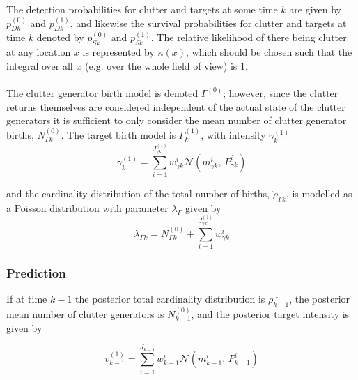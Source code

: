 \documentclass{article}
\begin{document}
The detection probabilities for clutter and targets at some time $k$ are given by $p_{Dk}^{(0)}$ and $p_{Dk}^{(1)}$, and likewise the survival probabilities for clutter and targets at time $k$ denoted by $p_{Sk}^{(0)}$ and $p_{Sk}^{(1)}$. The relative likelihood of there being clutter at any location $x$ is represented by $\kappa(x)$, which should be chosen such that the integral over all $x$ (e.g. over the whole field of view) is $1$.\\
\\
The clutter generator birth model is denoted $\Gamma^{(0)}$; however, since the clutter returns themselves are considered independent of the actual state of the clutter generators it is sufficient to only consider the mean number of clutter generator births, $N_{\Gamma k}^{(0)}$. The target birth model is $\Gamma^{(1)}_k$, with intensity $\gamma^{(1)}_k$
\begin{equation}
  \label{eq:tgt_birth}
\gamma^{(1)}_k = \sum_{i=1}^{J_{\gamma k}^{(1)}}w_{\gamma k}^i \mathcal{N}(m_{\gamma k}^i,\,P_{\gamma k}^i)
\end{equation}

and the cardinality distribution of the total number of births, $\ddot{\rho}_{\Gamma k}$, is modelled as a Poisson distribution with parameter $\lambda_\Gamma$ given by
\begin{equation}
  \label{eq:rho_gamma}
\lambda_{\Gamma k} = N_{\Gamma k}^{(0)} + \sum_{i=1}^{J_{\gamma k}^{(1)}}w_{\gamma k}^i 
\end{equation}

\subsubsection*{Prediction}
If at time $k-1$ the posterior total cardinality distribution is $\ddot{\rho_{k-1}}$, the posterior mean number of clutter generators is $N^{(0)}_{k-1}$, and the posterior target intensity is given by

\begin{equation}
  \label{eq:vk}
  v^{(1)}_{k-1} = \sum_{i = 1}^{J_{k-1}}w_{k-1}^i \mathcal{N}(m_{k-1}^i,\,P_{k-1}^i)
\end{equation}
\end{document}
